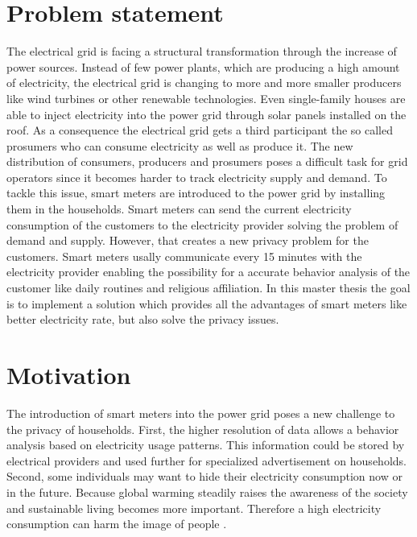 \documentclass[english,sigconf,11pt]{acmart}
\begin{document}


\def\@copyrightspace{\relax}

\maketitle

\section{Problem statement}


The electrical grid is facing a structural transformation through the increase of power sources. Instead of few power plants, which are producing a high amount of electricity, the electrical grid is changing to more and more smaller producers like wind turbines or other renewable technologies. Even single-family houses are able to inject electricity into the power grid through solar panels installed on the roof. As a consequence the electrical grid gets a third participant the so called prosumers who can consume electricity as well as produce it. The new distribution of consumers, producers and prosumers poses a difficult task for grid operators since it becomes harder to track electricity supply and demand. To tackle this issue, smart meters are introduced to the power grid by installing them in the households. Smart meters can send the current electricity consumption of the customers to the electricity provider solving the problem of demand and supply. However, that creates a new privacy problem for the customers. Smart meters usally communicate every 15 minutes with the electricity provider enabling the possibility for a accurate behavior analysis of the customer like daily routines and religious affiliation. In this master thesis the goal is to implement a solution which provides all the advantages of smart meters like better electricity rate, but also solve the privacy issues.
\section{Motivation}
The introduction of smart meters into the power grid poses a new challenge to the privacy of households. First, the higher resolution of data allows a behavior analysis based on electricity usage patterns. This information could be stored by electrical providers and used further for specialized advertisement on households. Second, some individuals may want to hide their electricity consumption now or in the future. Because global warming steadily raises the awareness of the society and sustainable living becomes more important. Therefore a high electricity consumption can harm the image of people \cite{spiegel}.
\end{document}
